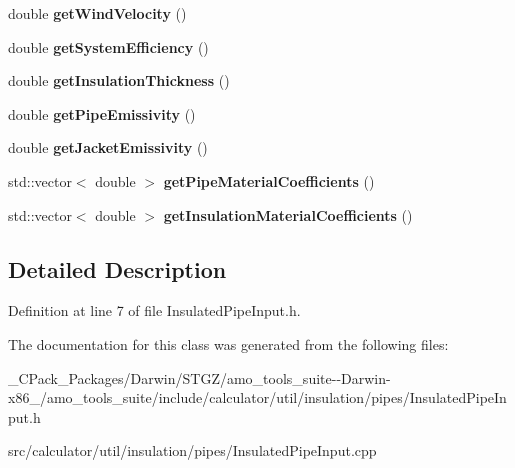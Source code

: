 \begin{DoxyCompactItemize}
double {\bfseries get\+Wind\+Velocity} ()
\item 
\mbox{\label{class_insulated_pipe_input_ac481d436018a38d58644d1727a7f3410}} 
double {\bfseries get\+System\+Efficiency} ()
\item 
\mbox{\label{class_insulated_pipe_input_af0bdfa676d8826ed34aa3e0bfc79c3d2}} 
double {\bfseries get\+Insulation\+Thickness} ()
\item 
\mbox{\label{class_insulated_pipe_input_a70b22d5788e76295f6de87036cebf1e4}} 
double {\bfseries get\+Pipe\+Emissivity} ()
\item 
\mbox{\label{class_insulated_pipe_input_a48db808f0b2e7ea4f5a13415cceec2ed}} 
double {\bfseries get\+Jacket\+Emissivity} ()
\item 
\mbox{\label{class_insulated_pipe_input_afb7a59efc836c819a79661b2c7c8032a}} 
std\+::vector$<$ double $>$ {\bfseries get\+Pipe\+Material\+Coefficients} ()
\item 
\mbox{\label{class_insulated_pipe_input_ad6dd2c9df8b6c3487d14808cba72a91d}} 
std\+::vector$<$ double $>$ {\bfseries get\+Insulation\+Material\+Coefficients} ()
\end{DoxyCompactItemize}


\subsection{Detailed Description}


Definition at line 7 of file Insulated\+Pipe\+Input.\+h.



The documentation for this class was generated from the following files\+:\begin{DoxyCompactItemize}
\item 
\+\_\+\+C\+Pack\+\_\+\+Packages/\+Darwin/\+S\+T\+G\+Z/amo\+\_\+tools\+\_\+suite-\/-\/\+Darwin-\/x86\+\_/amo\+\_\+tools\+\_\+suite/include/calculator/util/insulation/pipes/Insulated\+Pipe\+Input.\+h\item 
src/calculator/util/insulation/pipes/Insulated\+Pipe\+Input.\+cpp\end{DoxyCompactItemize}
